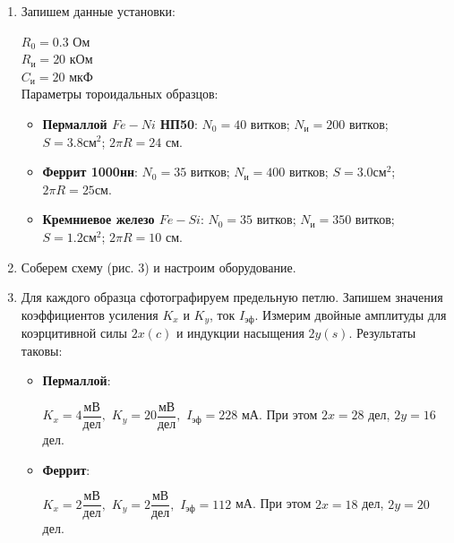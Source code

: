 \documentclass[a4paper]{article}
\begin{document}
\begin{enumerate}
	\item Запишем данные установки:

	      $R_{0}=0.3$ Ом \\
	      $R_\text{и}=20$ кОм \\
	      $C_\text{и}=20$ мкФ \\

	      Параметры тороидальных образцов:

	      \begin{itemize}

		      \item	\textbf{Пермаллой $ Fe-Ni $  НП50}:
		            $N_{0}=40$ витков;
		            $N_{и}=200$ витков;
		            $S=3.8 \text{см}^{2}$;
		            $2\pi R = 24 $ см.

		      \item	\textbf{Феррит 1000нн}:
		            $N_{0}=35$ витков;
		            $N_{и}=400$ витков;
		            $S=3.0 см^{2}$;
		            $2\pi R = 25 см $.

		      \item 	\textbf{Кремниевое железо $ Fe-Si $}:
		            $N_{0}=35$ витков;
		            $N_{и}=350$ витков;
		            $S=1.2 \text{см}^2$;
		            $2\pi R = 10$ см.
	      \end{itemize}


	\item Соберем схему (рис. 3) и настроим оборудование.

	\item Для каждого образца сфотографируем предельную петлю. Запишем значения коэффициентов усиления $K_{x}$ и $K_{y}$, ток $I_{эф}$. Измерим двойные амплитуды для коэрцитивной силы $2x(c)$ и индукции насыщения $2y(s)$. Результаты таковы:

	      \begin{itemize}

		      \item 	\textbf{Пермаллой}:

		            $K_{x}=4 \dfrac{\text{мВ}}{\text{дел}},$
		            $K_{y}=20 \dfrac{\text{мВ}}{\text{дел}},$
		            $I_\text{эф} = 228$ мА.
		            При этом $ 2x = 28$ дел, $2y = 16$ дел.

		      \item 	 \textbf{Феррит}:

		            $K_{x}=2 \dfrac{\text{мВ}}{\text{дел}},$
		            $K_{y}=2 \dfrac{\text{мВ}}{\text{дел}},$
		            $I_\text{эф} = 112$ мА.
		            При этом $ 2x = 18$ дел, $2y = 20$ дел.


\end{itemize}
\end{enumerate}
\end{document}
